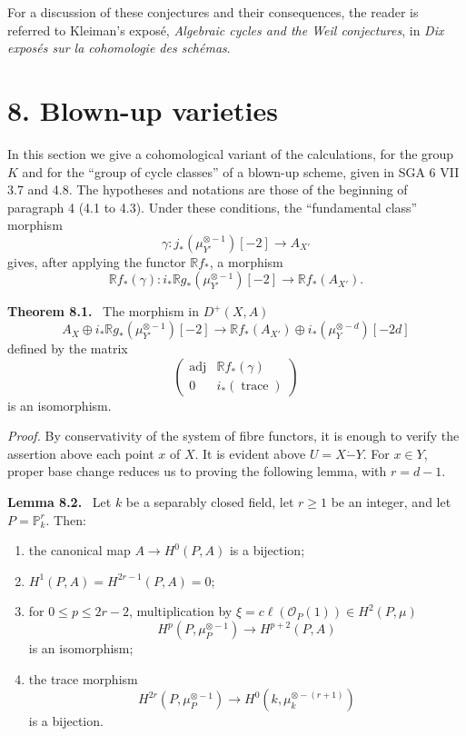 \documentclass[11pt]{article}
\newenvironment{statement}[1]{\par\medskip\noindent\textbf{#1.}\ }{\par\medskip}
\begin{document}
For a discussion of these conjectures and their consequences, the reader is referred to Kleiman's exposé, \emph{Algebraic cycles and the Weil conjectures}, in \emph{Dix exposés sur la cohomologie des schémas}.

\section*{8. Blown-up varieties}

In this section we give a cohomological variant of the calculations, for the group $K$ and for the ``group of cycle classes'' of a blown-up scheme, given in SGA 6 VII 3.7 and 4.8. The hypotheses and notations are those of the beginning of paragraph 4 (4.1 to 4.3). Under these conditions, the ``fundamental class'' morphism
\[
\gamma:j_*(\mu_{Y'}^{\otimes -1})[-2]\to A_{X'}
\]
gives, after applying the functor $\mathbb{R}f_*$, a morphism
\[
\mathbb{R}f_*(\gamma):i_*\mathbb{R}g_*(\mu_{Y'}^{\otimes -1})[-2]\to \mathbb{R}f_*(A_{X'}).
\]

\begin{statement}{Theorem 8.1}
The morphism in $D^+(X,A)$
\[
A_X\oplus i_*\mathbb{R}g_*(\mu_{Y'}^{\otimes -1})[-2]\to
\mathbb{R}f_*(A_{X'})\oplus i_*(\mu_Y^{\otimes -d})[-2d]
\tag{8.1.1}
\]
defined by the matrix
\[
\begin{pmatrix}
\operatorname{adj}&\mathbb{R}f_*(\gamma)\\
0&i_*(\operatorname{trace})
\end{pmatrix}
\]
is an isomorphism.
\end{statement}

\emph{Proof.} By conservativity of the system of fibre functors, it is enough to verify the assertion above each point $x$ of $X$. It is evident above $U=X\mathbin{\dot{-}}Y$. For $x\in Y$, proper base change reduces us to proving the following lemma, with $r=d-1$.

\begin{statement}{Lemma 8.2}
Let $k$ be a separably closed field, let $r\ge1$ be an integer, and let $P=\mathbb P_k^r$. Then:
\begin{enumerate}[label=\alph*)]
\item the canonical map $A\to H^0(P,A)$ is a bijection;
\item $H^1(P,A)=H^{2r-1}(P,A)=0$;
\item for $0\le p\le2r-2$, multiplication by $\xi=c\ell(\mathcal O_P(1))\in H^2(P,\mu)$
\[
H^p(P,\mu_P^{\otimes -1})\to H^{p+2}(P,A)
\]
is an isomorphism;
\item the trace morphism
\[
H^{2r}(P,\mu_P^{\otimes -1})\to H^0(k,\mu_k^{\otimes -(r+1)})
\]
is a bijection.
\end{enumerate}
\end{statement}
\end{document}

